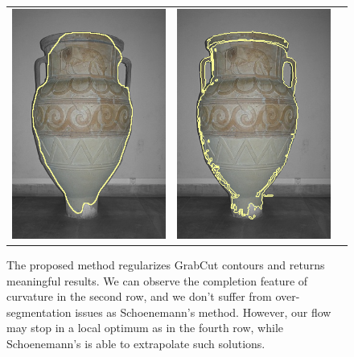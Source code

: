 \documentclass[smallextended]{svjour3}       %
\begin{document}
{{\begin{figure}[ht!]
\begin{tabular}{ccc}
		\includegraphics[scale=0.2]{images/segmentation/bc/vase/corrected-seg.png} &					\includegraphics[scale=0.2]{images/segmentation/schoenemann/vase/vase-seg.png}		
	\end{tabular}
	\caption{The proposed method regularizes GrabCut contours and returns meaningful results. We can observe the completion feature of curvature in the second row, and we don't suffer from over-segmentation issues as Schoenemann's method. However, our flow may stop in a local optimum as in the fourth row, while Schoenemann's is able to extrapolate such solutions.}
	\label{fig:segmentation-results}	
\end{figure}


}}
\end{document}
